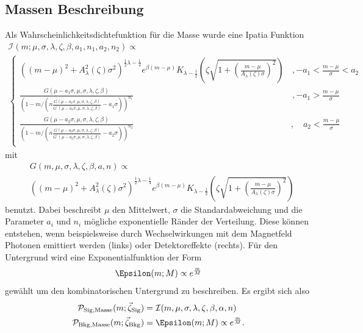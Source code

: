 \subsection{Massen Beschreibung}

Als Wahrscheinlichkeitsdichtefunktion für die Masse wurde eine Ipatia Funktion \cite{ipatia}
\begin{multline}
			\mathcal{I}(m;\mu,\sigma,\lambda,\zeta,\beta,a_1,n_1,a_2,n_2) \propto \\
			\begin{cases}
			\left(\left(m - \mu\right)^2 + A_{\lambda}^2(\zeta)\sigma^2\right)^{\frac{1}{2}\lambda - \frac{1}{4}} e^{\beta(m - \mu)} K_{\lambda - \frac{1}{2}}\left(\zeta\sqrt{1 + \left(\frac{m - \mu}{A_\lambda(\zeta)\sigma}\right)^2}\right)	&\, ,  - a_1 < \frac{m - \mu}{\sigma} < a_2 \\
			\frac{G(\mu - a_1 \sigma,\mu,\sigma,\lambda,\zeta,\beta)}{\left(1 - m/(n \frac{G(\mu - a_1\sigma,\mu,\sigma,\lambda,\zeta,\beta)}{G^\prime(\mu - a_1 \sigma,\mu,\sigma,\lambda,\zeta,\beta)} -a_1 \sigma)\right)^{n_1}}	&\, , - a_1 > \frac{m - \mu}{\sigma} \\
			\frac{G(\mu - a_2 \sigma,\mu,\sigma,\lambda,\zeta,\beta)}{\left(1 - m/(n \frac{G(\mu - a_2\sigma,\mu,\sigma,\lambda,\zeta,\beta)}{G^\prime(\mu - a_2 \sigma,\mu,\sigma,\lambda,\zeta,\beta)} -a_2 \sigma)\right)^{n_2}}	&,\quad a_2 < \frac{m - \mu}{\sigma} \\
			\end{cases}
			\label{eq:ipatia}
		\end{multline}
mit 
\begin{equation}
\begin{split}
&G(m,\mu,\sigma,\lambda,\zeta,\beta,a,n)\propto\\
&\left(\left(m-\mu\right)^2+A_\lambda^2(\zeta)\sigma^2\right)^{\frac{1}{2}\lambda-\frac{1}{4}}e^{\beta\left(m-\mu\right)}K_{\lambda-\frac{1}{2}}\left(\zeta\sqrt{1+\left(\frac{m-\mu}{A_\lambda(\zeta)\sigma}\right)^2}\right)
\end{split}
\end{equation}
benutzt. Dabei beschreibt $\mu$ den Mittelwert, $\sigma$ die Standardabweichung und die Parameter $a_i$ und $n_i$ mögliche exponentielle Ränder der Verteilung. Diese können entstehen, wenn beispielsweise durch Wechselwirkungen mit dem Magnetfeld Photonen emittiert werden (links) oder Detektoreffekte (rechts). Für den Untergrund wird eine Exponentialfunktion der Form
\begin{equation}
\Epsilon(m;M)\propto e^{\frac{m}{M}}
\end{equation}
gewählt um den kombinatorischen Untergrund zu beschreiben. Es ergibt sich also
\begin{equation}
\begin{split}
\mathcal{P}_\text{Sig,Masse}(m;\vec{\zeta}_\text{Sig})&=\mathcal{I}(m,\mu,\sigma,\lambda,\zeta,\beta,\alpha,n)\\
\mathcal{P}_\text{Bkg,Masse}(m;\vec{\zeta}_\text{Bkg})&=\Epsilon(m;M)\propto e^{\frac{m}{M}}.
\end{split}
\end{equation}
